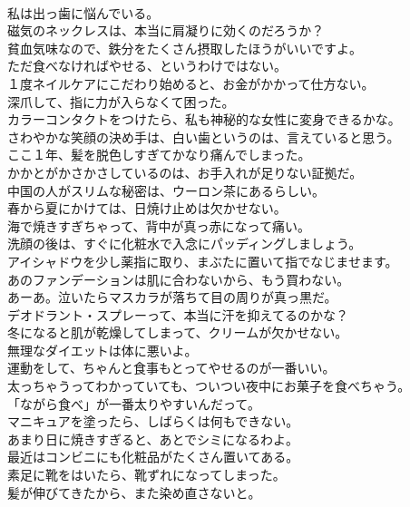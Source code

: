 \documentclass[8pt]{extreport}
\begin{document}
\begin{CJK}{UTF8}{min}
\\	私は出っ歯に悩んでいる。	
\\	磁気のネックレスは、本当に肩凝りに効くのだろうか？	
\\	貧血気味なので、鉄分をたくさん摂取したほうがいいですよ。	
\\	ただ食べなければやせる、というわけではない。	
\\	１度ネイルケアにこだわり始めると、お金がかかって仕方ない。	
\\	深爪して、指に力が入らなくて困った。	
\\	カラーコンタクトをつけたら、私も神秘的な女性に変身できるかな。	
\\	さわやかな笑顔の決め手は、白い歯というのは、言えていると思う。	
\\	ここ１年、髪を脱色しすぎてかなり痛んでしまった。	
\\	かかとがかさかさしているのは、お手入れが足りない証拠だ。	
\\	中国の人がスリムな秘密は、ウーロン茶にあるらしい。	
\\	春から夏にかけては、日焼け止めは欠かせない。	
\\	海で焼きすぎちゃって、背中が真っ赤になって痛い。	
\\	洗顔の後は、すぐに化粧水で入念にパッディングしましょう。	
\\	アイシャドウを少し薬指に取り、まぶたに置いて指でなじませます。	
\\	あのファンデーションは肌に合わないから、もう買わない。	
\\	あーあ。泣いたらマスカラが落ちて目の周りが真っ黒だ。	
\\	デオドラント・スプレーって、本当に汗を抑えてるのかな？	
\\	冬になると肌が乾燥してしまって、クリームが欠かせない。	
\\	無理なダイエットは体に悪いよ。	
\\	運動をして、ちゃんと食事もとってやせるのが一番いい。	
\\	太っちゃうってわかっていても、ついつい夜中にお菓子を食べちゃう。	
\\	「ながら食べ」が一番太りやすいんだって。	
\\	マニキュアを塗ったら、しばらくは何もできない。	
\\	あまり日に焼きすぎると、あとでシミになるわよ。	
\\	最近はコンビニにも化粧品がたくさん置いてある。	
\\	素足に靴をはいたら、靴ずれになってしまった。	
\\	髪が伸びてきたから、また染め直さないと。	

\end{CJK}
\end{document}
